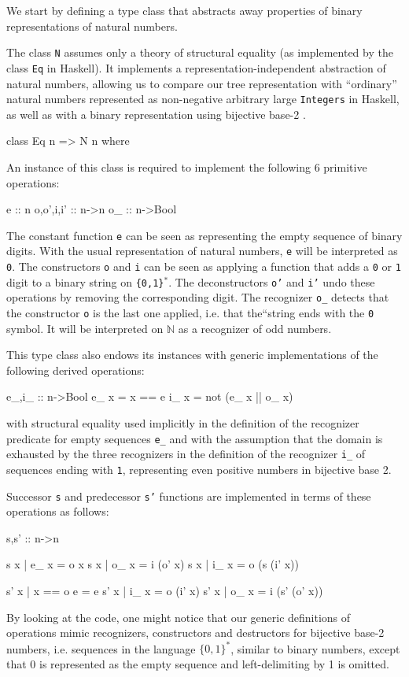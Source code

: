 \documentclass{TOOLS/llncs}
\begin{document}
We start by defining a type class that abstracts away 
properties of binary representations of natural numbers.


The class {\tt N} assumes only a theory of structural equality (as
implemented by the class {\tt Eq} in Haskell).
It implements a representation-independent
abstraction of natural numbers, allowing us to compare our
tree representation with ``ordinary'' natural numbers represented
as non-negative arbitrary large {\tt Integers} in Haskell,
as well as with a binary representation using bijective base-2
\cite{wiki:bijbase}.

\begin{code}
class Eq n => N n where
\end{code}
An instance of this class is required to implement the following 6
primitive operations:
\begin{code}
  e :: n
  o,o',i,i' :: n->n
  o_ :: n->Bool
\end{code}
The constant function {\tt e} can be seen as representing the empty sequence of 
binary digits. 
With the usual representation of natural numbers, {\tt e} will be interpreted as
{\tt 0}.  The constructors {\tt o} and {\tt i} can be seen as
applying a function that adds a {\tt 0} or {\tt 1} digit to a binary
string on {\tt \{0,1\}$^*$}. The deconstructors {\tt o'} and {\tt i'} undo
these operations by removing the corresponding digit. The recognizer
{\tt o\_} detects that the constructor {\tt o} is the last one applied,
i.e. that the``string ends with the {\tt 0} symbol. It will be interpreted
on $\mathbb{N}$ as a recognizer of odd numbers.
 
This type class also endows its instances with generic implementations of
the following derived operations:
\begin{code}
  e_,i_ :: n->Bool
  e_ x = x == e
  i_ x = not (e_ x || o_ x)
\end{code}
with structural equality used implicitly 
in the definition of the recognizer predicate for
empty sequences {\tt e\_}
and with the assumption that the domain is exhausted by the three recognizers
in the definition of the recognizer {\tt i\_} of
sequences ending with {\tt 1}, representing {\rm even} positive numbers
in bijective base 2.

Successor {\tt s} and predecessor {\tt s'} functions are implemented in terms
of these operations as follows:
\begin{code}  
  s,s' :: n->n
  
  s x | e_ x = o x
  s x | o_ x = i (o' x)
  s x | i_ x = o (s (i' x))
  
  s' x | x == o e = e
  s' x | i_ x = o (i' x)
  s' x | o_ x = i (s' (o' x))
\end{code}
By looking at the code, one might notice that our generic definitions
of operations mimic recognizers, constructors and destructors for bijective
base-2 numbers, i.e. sequences in the language $\{0,1\}^{*}$, similar to binary
numbers, except that 0 is represented as the empty sequence and left-delimiting by 1 is
omitted.
\end{document}
